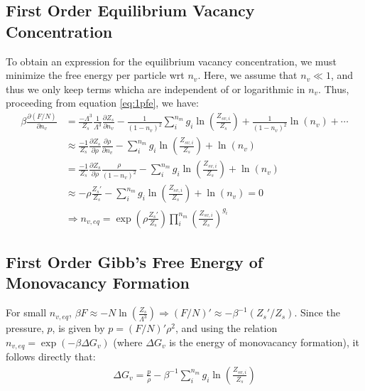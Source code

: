 \documentclass[paper=a4, fontsize=11pt]{scrartcl} %
\numberwithin{equation}{section} %
\numberwithin{figure}{section} %
\numberwithin{table}{section} %
\begin{document}
\subsection{First Order Equilibrium Vacancy Concentration}
To obtain an expression for the equilibrium vacancy concentration, we must
minimize the free energy per particle wrt $n_v$.  Here, we assume that
$n_v \ll 1$, and thus we only keep terms whicha are independent of or
logarithmic in $n_v$.  Thus, proceeding from equation \ref{eq:1pfe}, we have:\\
\begin{align}
  \beta\frac{\partial(F/N)}{\partial n_v} &= 
  \frac{-\Lambda^3}{Z_s}\frac{1}{\Lambda^3}\frac{\partial Z_s}{\partial n_v}-
  \frac{1}{(1-n_v)^2}\sum\limits_i^{n_m}g_i \ln\left(\frac{Z_{sv,i}}{Z_s}\right)+
  \frac{1}{(1-n_v)^2}\ln(n_v) + \cdots\\
  &\approx \frac{-1}{Z_s}\frac{\partial Z_s}{\partial \rho}
  \frac{\partial\rho}{\partial n_v} - 
  \sum\limits_i^{n_m} g_i \ln\left(\frac{Z_{sv,i}}{Z_s}\right) + \ln(n_v)\\
  &= \frac{-1}{Z_s}\frac{\partial Z_s}{\partial \rho}\frac{\rho}{(1-n_v)^2}-
  \sum\limits_i^{n_m} g_i \ln\left(\frac{Z_{sv,i}}{Z_s}\right) + \ln(n_v)\\
  &\approx -\rho\frac{Z_s'}{Z_s} - 
  \sum\limits_i^{n_m} g_i \ln\left(\frac{Z_{sv,i}}{Z_s}\right) + \ln(n_v) = 0\\
  \label{eq:1pnveq}
  &\Rightarrow \boxed{n_{v,eq} = \exp\left(\rho\frac{Z_s'}{Z_s}\right)
  \prod\limits_i^{n_m}\left(\frac{Z_{sv,i}}{Z_s}\right)^{g_i}}
\end{align}

\subsection{First Order Gibb's Free Energy of Monovacancy Formation}
For small $n_{v,eq}$, $\beta F \approx -N\ln\left(\frac{Z_s}{\Lambda^3}\right)
\Rightarrow (F/N)' \approx -\beta^{-1} (Z_s'/Z_s)$.  Since the pressure, $p$,
is given by $p = (F/N)' \rho^2$, and using the relation
$n_{v,eq} = \exp(-\beta\Delta G_v)$ (where $\Delta G_v$ is the energy of 
monovacancy formation), it follows directly that:\\
\begin{align}
  \label{eq:1pdg}
  \boxed{\Delta G_v = \frac{p}{\rho}-
  \beta^{-1}\sum\limits_i^{n_m}g_i\ln\left(\frac{Z_{sv,i}}{Z_s}\right)}
\end{align}

\end{document}
